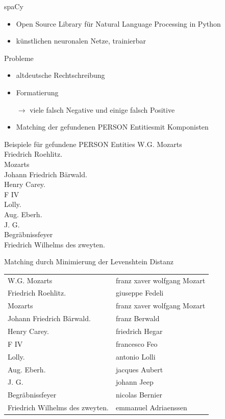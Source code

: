 \documentclass[aspectratio=169]{beamer}
\begin{document}
\begin{frame}{spaCy}
	\begin{itemize}
		\item Open Source Library für Natural Language Processing in Python
		\item künstlichen neuronalen Netze, trainierbar
	\end{itemize}
\begin{block}{Probleme}
	\begin{itemize}
	\item altdeutsche Rechtschreibung
	\item Formatierung
	\item[$\rightarrow $ ] viele falsch Negative und einige falsch Positive
	\item Matching der gefundenen \glqq PERSON Entities\grqq mit Komponisten
	\end{itemize}
\end{block}
\end{frame}
\begin{frame}{Beispiele für gefundene \glqq PERSON Entities\grqq}
	W.G. Mozarts\\
	Friedrich Roehlitz.\\
	Mozarts\\
	Johann Friedrich Bärwald.\\
	Henry Carey.\\
	F IV\\
	Lolly.\\
	Aug. Eberh.\\
	J. G.\\
	Begräbnissfeyer\\
	Friedrich Wilhelms des zweyten.\\
\end{frame}
\begin{frame}{Matching durch Minimierung der Levenshtein Distanz}
	\fontsize{9pt}{10pt}\selectfont
	\begin{tabular}{l | l}
		W.G. Mozarts  & franz xaver wolfgang Mozart\\
		Friedrich Roehlitz. & giuseppe Fedeli\\
		Mozarts & franz xaver wolfgang Mozart\\
		Johann Friedrich Bärwald. & franz Berwald\\
		Henry Carey. & friedrich Hegar\\
		F IV & francesco Feo\\
		Lolly. & antonio Lolli\\
		Aug. Eberh. & jacques Aubert\\
		J. G. & johann Jeep\\
		Begräbnissfeyer & nicolas Bernier\\
		Friedrich Wilhelms des zweyten. & emmanuel Adriaenssen\\
	\end{tabular}
\end{frame}
\end{document}
